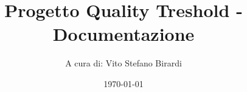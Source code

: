 
\newcommand{\Titolo}{Progetto Quality Treshold - Documentazione}
\newcommand{\Data}{\today}
\newcommand{\Materia}{}


\newcommand{\image}[3]{
    \begin{figure}[h!]
    \centering
    \texttt{[image: \#1]}
    \caption{#2}
    \label{#3}
\end{figure}}


\documentclass[a4paper]{article}
\usepackage{amsmath}
\usepackage{amssymb}


\usepackage[italian]{babel}


\usepackage{fancyvrb}
\usepackage{fancyhdr, lastpage}


\usepackage{cancel}
\usepackage{etoolbox}
\usepackage{xcolor}
\usepackage{subfig}
\usepackage{tikz, lmodern}
\usepackage[T1]{fontenc}
\usepackage[most]{tcolorbox}
\usepackage{graphicx}
\usepackage{hyperref}
\usepackage{parskip}
\usepackage{multicol}
\pagestyle{fancy}


\hypersetup{
    colorlinks=true,
    linkcolor=blue,
    filecolor=magenta, 
    urlcolor=blue,
    pdfpagemode=FullScreen
}


\lhead{\Data}
\lfoot{\Materia}
\renewcommand{\footrulewidth}{0.5pt}
\fancyfoot[C]{}
\patchcmd{\chapter}{\thispagestyle{plain}}{\thispagestyle{fancy}}{}


\title{\Titolo}
\author{
    A cura di: 
    Vito Stefano Birardi
}
\date{\Data}




\maketitle
\newpage
\hypertarget{toc}{\tableofcontents}
\newpage





